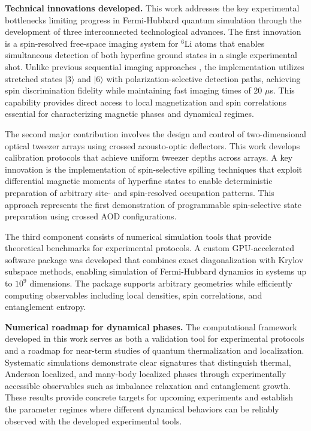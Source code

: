 
\textbf{Technical innovations developed.} This work addresses the key experimental bottlenecks limiting progress in Fermi-Hubbard quantum simulation through the development of three interconnected technological advances. The first innovation is a spin-resolved free-space imaging system for $^6$Li atoms that enables simultaneous detection of both hyperfine ground states in a single experimental shot. Unlike previous sequential imaging approaches \cite{bergschneider_spin-resolved_2018}, the implementation utilizes stretched states $|3\rangle$ and $|6\rangle$ with polarization-selective detection paths, achieving  spin discrimination fidelity while maintaining fast imaging times of 20 $\mu$s. This capability provides direct access to local magnetization and spin correlations essential for characterizing magnetic phases and dynamical regimes.

The second major contribution involves the design and control of two-dimensional optical tweezer arrays using crossed acousto-optic deflectors. This work develops calibration protocols that achieve uniform tweezer depths across arrays. A key innovation is the implementation of spin-selective spilling techniques that exploit differential magnetic moments of hyperfine states to enable deterministic preparation of arbitrary site- and spin-resolved occupation patterns. This approach represents the first demonstration of programmable spin-selective state preparation using crossed AOD configurations.

The third component consists of numerical simulation tools that provide theoretical benchmarks for experimental protocols. A custom GPU-accelerated software package was developed that combines exact diagonalization with Krylov subspace methods, enabling simulation of Fermi-Hubbard dynamics in systems up to $10^9$ dimensions. The package supports arbitrary geometries while efficiently computing observables including local densities, spin correlations, and entanglement entropy.

\textbf{Numerical roadmap for dynamical phases.} The computational framework developed in this work serves as both a validation tool for experimental protocols and a roadmap for near-term studies of quantum thermalization and localization. Systematic simulations demonstrate clear signatures that distinguish thermal, Anderson localized, and many-body localized phases through experimentally accessible observables such as imbalance relaxation and entanglement growth. These results provide concrete targets for upcoming experiments and establish the parameter regimes where different dynamical behaviors can be reliably observed with the developed experimental tools.


